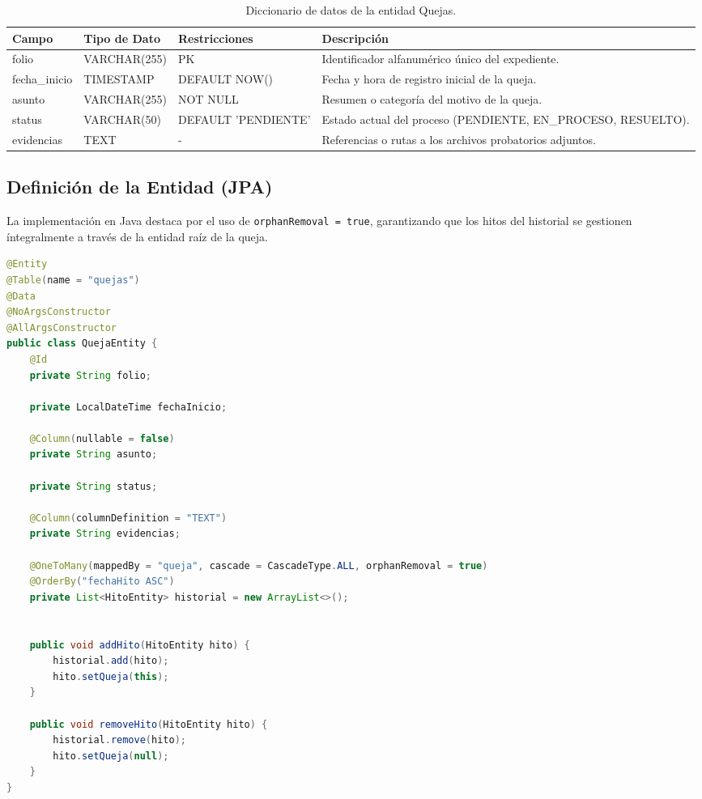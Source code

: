\begin{table}[H]
\centering
\small
\begin{tabularx}{\textwidth}{|l|l|l|X|}
\hline
\rowcolor{azulESCOM} 
\color{white}\textbf{Campo} & \color{white}\textbf{Tipo de Dato} & \color{white}\textbf{Restricciones} & \color{white}\textbf{Descripci\'on} \\ \hline
folio & VARCHAR(255) & PK & Identificador alfanum\'erico \'unico del expediente. \\ \hline
fecha\_inicio & TIMESTAMP & DEFAULT NOW() & Fecha y hora de registro inicial de la queja. \\ \hline
asunto & VARCHAR(255) & NOT NULL & Resumen o categor\'ia del motivo de la queja. \\ \hline
status & VARCHAR(50) & DEFAULT 'PENDIENTE' & Estado actual del proceso (PENDIENTE, EN\_PROCESO, RESUELTO). \\ \hline
evidencias & TEXT & - & Referencias o rutas a los archivos probatorios adjuntos. \\ \hline
\end{tabularx}
\caption{Diccionario de datos de la entidad Quejas.}
\label{tab:dict_quejas}
\end{table}

\subsection{Definici\'on de la Entidad (JPA)}
La implementaci\'on en Java destaca por el uso de \texttt{orphanRemoval = true}, garantizando que los hitos del historial se gestionen \'integralmente a trav\'es de la entidad ra\'iz de la queja.

\begin{lstlisting}[language=Java, caption={Entidad Java para la gesti\'on de quejas y expedientes.}, label={lst:java_quejas}]
@Entity
@Table(name = "quejas")
@Data
@NoArgsConstructor
@AllArgsConstructor
public class QuejaEntity {
    @Id
    private String folio;
    
    private LocalDateTime fechaInicio;
    
    @Column(nullable = false)
    private String asunto;
    
    private String status;
    
    @Column(columnDefinition = "TEXT")
    private String evidencias; 
    
    @OneToMany(mappedBy = "queja", cascade = CascadeType.ALL, orphanRemoval = true)
    @OrderBy("fechaHito ASC") 
    private List<HitoEntity> historial = new ArrayList<>();
    
    
    public void addHito(HitoEntity hito) {
        historial.add(hito);
        hito.setQueja(this);
    }
    
    public void removeHito(HitoEntity hito) {
        historial.remove(hito);
        hito.setQueja(null);
    }
}
\end{lstlisting}

